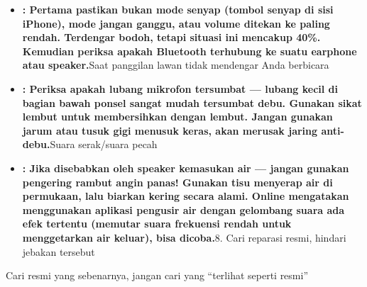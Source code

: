 
\begin{itemize}
  \item \textbf{: Pertama pastikan bukan mode senyap (tombol senyap di sisi iPhone), mode jangan ganggu, atau volume ditekan ke paling rendah. Terdengar bodoh, tetapi situasi ini mencakup 40\%. Kemudian periksa apakah Bluetooth terhubung ke suatu earphone atau speaker.}Saat panggilan lawan tidak mendengar Anda berbicara
  \item \textbf{: Periksa apakah lubang mikrofon tersumbat — lubang kecil di bagian bawah ponsel sangat mudah tersumbat debu. Gunakan sikat lembut untuk membersihkan dengan lembut. Jangan gunakan jarum atau tusuk gigi menusuk keras, akan merusak jaring anti-debu.}Suara serak/suara pecah
  \item \textbf{: Jika disebabkan oleh speaker kemasukan air — jangan gunakan pengering rambut angin panas! Gunakan tisu menyerap air di permukaan, lalu biarkan kering secara alami. Online mengatakan menggunakan aplikasi pengusir air dengan gelombang suara ada efek tertentu (memutar suara frekuensi rendah untuk menggetarkan air keluar), bisa dicoba.}8. Cari reparasi resmi, hindari jebakan tersebut
\end{itemize}


Cari resmi yang sebenarnya, jangan cari yang “terlihat seperti resmi”

